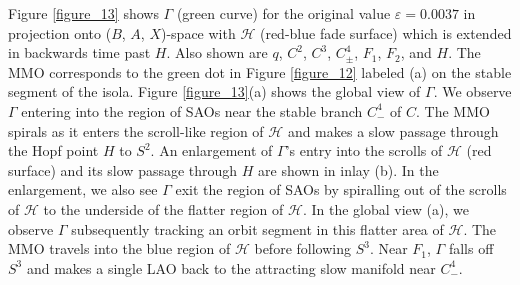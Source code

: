 \documentclass{ws-ijbc}
\begin{document}
Figure \ref{figure_13} shows $\Gamma$ (green curve) for the original value $\varepsilon=0.0037$ in projection onto ($B$, $A$, $X$)-space with $\mathscr{H}$ (red-blue fade surface) which is extended in backwards time past $H$.  Also shown are $q$, $C^2$, $C^3$, $C^4_\pm$, $F_1$, $F_2$, and $H$.  The MMO corresponds to the green dot in Figure \ref{figure_12} labeled (a) on the stable segment of the isola.  Figure \ref{figure_13}(a) shows the global view of $\Gamma$.  We observe $\Gamma$ entering into the region of SAOs near the stable branch $C^4_-$ of $C$.  The MMO spirals as it enters the scroll-like region of $\mathscr{H}$ and makes a slow passage through the Hopf point $H$ to $S^2$.  An enlargement of $\Gamma$'s entry into the scrolls of $\mathscr{H}$ (red surface) and its slow passage through $H$ are shown in inlay (b).  In the enlargement, we also see $\Gamma$ exit the region of SAOs by spiralling out of the scrolls of $\mathscr{H}$ to the underside of the flatter region of $\mathscr{H}$.  In the global view (a), we observe $\Gamma$ subsequently tracking an orbit segment in this flatter area of $\mathscr{H}$.  The MMO travels into the blue region of $\mathscr{H}$ before following $S^3$.  Near $F_1$, $\Gamma$ falls off $S^3$ and makes a single LAO back to the attracting slow manifold near $C^4_-$.
\end{document}
